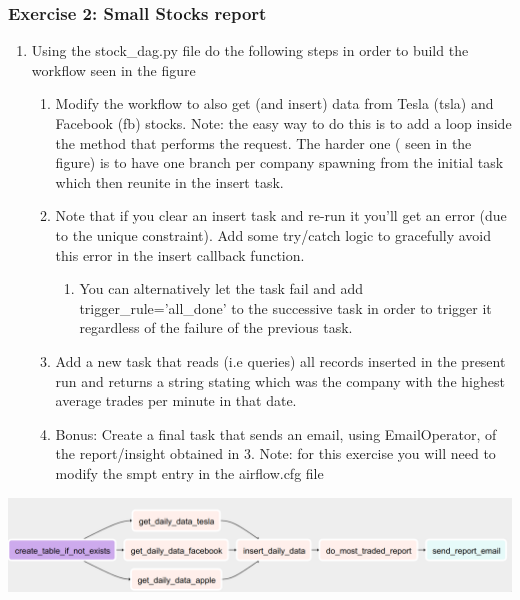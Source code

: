 \documentclass[leqno, 10pt, envcountsect]{beamer}
\numberwithin{equation}{section}
\theoremstyle{definition}
\theoremstyle{example}
\numberwithin{figure}{section}
\numberwithin{table}{section}
\let\olditem\item
\renewcommand{\item}{%
\olditem\vspace{1pt}}
\begin{document}
\begin{frame}[fragile=singleslide]
  \frametitle{Exercise 2: Small Stocks report}
  \begin{enumerate}
    \item Using the stock_dag.py file do the following steps in order to build the
workflow seen in the figure
    \begin{enumerate}
      \item Modify the workflow to also get (and insert) data from Tesla (tsla)
        and Facebook (fb) stocks. Note: the easy way to do this is to add a
        loop inside the method that performs the request. The harder one (
        seen in the figure) is to have one branch
        per company spawning from the initial task which then reunite in the
        insert task.
      \item Note that if you clear an insert task and re-run it you'll get an
        error (due to the unique constraint). Add some try/catch logic to
        gracefully avoid this error in the insert callback function.
        \begin{enumerate}
          \item You can alternatively let the task fail and add trigger_rule='all_done' to the
        successive task in order to trigger it regardless of the failure of the previous task.
        \end{enumerate}
      \item Add a new task that reads (i.e queries) all records inserted in the present run and returns a string stating which was the company with the highest average trades per minute in that date.

      \item Bonus: Create a final task that sends an email, using EmailOperator, of the
report/insight obtained in 3.  Note: for this exercise you will need to modify the
smpt entry in the airflow.cfg file
        \end{enumerate}
        \end{enumerate}
    \begin{center}
       \includegraphics[scale=0.1]{exercise_2.png}
    \end{center}
\end{frame}
\end{document}
